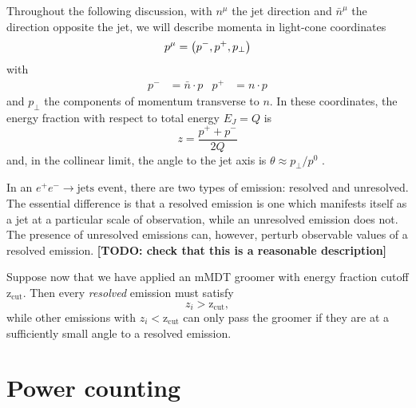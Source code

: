 \documentclass[12pt,twoside,class=../reedthesis, crop=false]{standalone}
\newcommand{\zcut}{\mathrm{z_{cut}}}
\begin{document}
	Throughout the following discussion, with $n^\mu$ the jet direction and $\bar n^\mu$ the direction opposite the jet, we will describe momenta in light-cone coordinates
	\begin{equation}
		p^\mu = \qty(p^-, p^+, p_\perp)
	\end{equation}
	with
	\begin{align}
		p^- &= \bar n \cdot p & p^+ &= n \cdot p
	\end{align}
	and $p_\perp$ the components of momentum transverse to $n$. In these coordinates, the energy fraction with respect to total energy $E_J = Q$ is
	\begin{equation}\label{eq:z light cone coordinates}
		z = \frac{p^+ + p^-}{2Q}
	\end{equation}
	and, in the collinear limit, the angle to the jet axis is $\theta \approx p_\perp / p^0$ \cite{frye_factorization_2016}.
	
	In an $e^+ e^- \to \text{jets}$ event, there are two types of emission: resolved and unresolved. The essential difference is that a resolved emission is one which manifests itself as a jet at a particular scale of observation, while an unresolved emission does not. The presence of unresolved emissions can, however, perturb observable values of a resolved emission. {\color{red}\textbf{[TODO: check that this is a reasonable description]}} 

	Suppose now that we have applied an mMDT groomer with energy fraction cutoff $\zcut$. Then every \textit{resolved} emission must satisfy
	\begin{equation}
		z_i > \zcut,
	\end{equation}
	while other emissions with $z_i < \zcut$ can only pass the groomer if they are at a sufficiently small angle to a resolved emission.

\section{Power counting}
\end{document}
